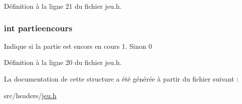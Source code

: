 Définition à la ligne 21 du fichier jeu.\-h.

\hypertarget{structstruct__debuttour_ae1ce459099bf548d3ae61f39c892ebbe}{
\subsubsection[{partieencours}]{\setlength{\rightskip}{0pt plus 5cm}int partieencours}}\label{structstruct__debuttour_ae1ce459099bf548d3ae61f39c892ebbe}
Indique si la partie est encors en cours 1. Sinon 0 

Définition à la ligne 20 du fichier jeu.\-h.



La documentation de cette structure a été générée à partir du fichier suivant \-:\begin{DoxyCompactItemize}
\item 
src/headers/\hyperlink{jeu_8h}{jeu.\-h}\end{DoxyCompactItemize}
